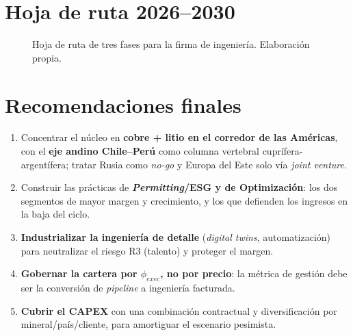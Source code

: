 \documentclass[11pt,letterpaper]{report}
\begin{document}
\section{Hoja de ruta 2026--2030}
\begin{figure}[htbp]
\centering
{}
\caption[Hoja de ruta estratégica 2026--2030]{Hoja de ruta de tres fases para la firma de ingeniería. Elaboración propia.}
\label{fig:roadmap}
\end{figure}

\section{Recomendaciones finales}
\begin{cajarecom}
\begin{enumerate}[label=\textbf{\arabic*.}]
\item Concentrar el núcleo en \textbf{cobre + litio en el corredor de las Américas}, con el \textbf{eje andino Chile--Perú} como
  columna vertebral cuprífera-argentífera; tratar Rusia como \emph{no-go} y Europa del Este solo vía \emph{joint venture}.
\item Construir las prácticas de \textbf{\emph{Permitting}/ESG y de Optimización}: los dos segmentos de mayor margen y crecimiento,
  y los que defienden los ingresos en la baja del ciclo.
\item \textbf{Industrializar la ingeniería de detalle} (\emph{digital twins}, automatización) para neutralizar el riesgo R3
  (talento) y proteger el margen.
\item \textbf{Gobernar la cartera por $\phi_{exec}$, no por precio}: la métrica de gestión debe ser la conversión de \emph{pipeline}
  a ingeniería facturada.
\item \textbf{Cubrir el CAPEX} con una combinación contractual y diversificación por mineral/país/cliente, para amortiguar el
  escenario pesimista.
\end{enumerate}
\end{cajarecom}
\end{document}

